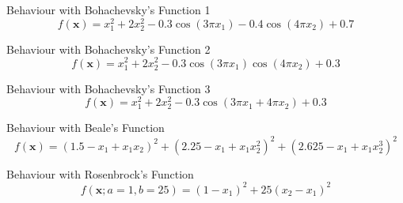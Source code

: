 \documentclass[10pt]{beamer}
\newcommand{\xbold}{\mathbf{x}}
\begin{document}
\begin{frame}{Behaviour with Bohachevsky's Function 1}
\begin{equation}
\label{B1}
f(\xbold) = x_{1}^{2} + 2x_{2}^{2} - 0.3\cos(3\pi x_{1}) - 0.4\cos(4\pi x_{2}) + 0.7
\end{equation}
\end{frame}

\begin{frame}{Behaviour with Bohachevsky's Function 2}
\begin{equation}
\label{B2}
f(\xbold) = x_{1}^{2} + 2x_{2}^{2} - 0.3\cos(3\pi x_{1})\cos(4\pi x_{2}) + 0.3
\end{equation}
\end{frame}

\begin{frame}{Behaviour with Bohachevsky's Function 3}
\begin{equation}
\label{B3}
f(\xbold) = x_{1}^{2} + 2x_{2}^{2} - 0.3\cos(3\pi x_{1} + 4\pi x_{2}) + 0.3
\end{equation}
\end{frame}

\begin{frame}{Behaviour with Beale's Function}
\begin{equation}
\label{BL}
f(\xbold) = (1.5 - x_{1} + x_{1}x_{2})^{2} + (2.25 - x_{1} + x_{1}x_{2}^{2})^{2} + (2.625 - x_{1} + x_{1}x_{2}^{3})^{2}
\end{equation}
\end{frame}

\begin{frame}{Behaviour with Rosenbrock's Function}
\begin{equation}
\label{RB}
f(\xbold;a=1, b=25) = (1 - x_{1})^{2} + 25(x_{2} - x_{1})^{2}
\end{equation}
\end{frame}
\end{document}
